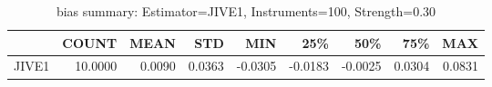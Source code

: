 \begin{table}[ht]
\centering
\caption{bias summary: Estimator=JIVE1, Instruments=100, Strength=0.30}
\begin{tabular}{lrrrrrrrr}
\toprule
 & COUNT & MEAN & STD & MIN & 25\% & 50\% & 75\% & MAX \\
\midrule
JIVE1 & 10.0000 & 0.0090 & 0.0363 & -0.0305 & -0.0183 & -0.0025 & 0.0304 & 0.0831 \\
\bottomrule
\end{tabular}
\end{table}
